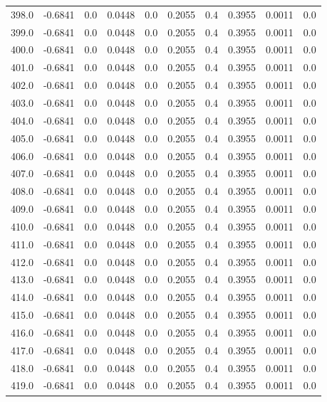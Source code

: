 \begin{longtable}{lrrrrrrrrr}
398.0 & -0.6841 & 0.0 & 0.0448 & 0.0 & 0.2055 & 0.4 & 0.3955 & 0.0011 & 0.0 \\
399.0 & -0.6841 & 0.0 & 0.0448 & 0.0 & 0.2055 & 0.4 & 0.3955 & 0.0011 & 0.0 \\
400.0 & -0.6841 & 0.0 & 0.0448 & 0.0 & 0.2055 & 0.4 & 0.3955 & 0.0011 & 0.0 \\
401.0 & -0.6841 & 0.0 & 0.0448 & 0.0 & 0.2055 & 0.4 & 0.3955 & 0.0011 & 0.0 \\
402.0 & -0.6841 & 0.0 & 0.0448 & 0.0 & 0.2055 & 0.4 & 0.3955 & 0.0011 & 0.0 \\
403.0 & -0.6841 & 0.0 & 0.0448 & 0.0 & 0.2055 & 0.4 & 0.3955 & 0.0011 & 0.0 \\
404.0 & -0.6841 & 0.0 & 0.0448 & 0.0 & 0.2055 & 0.4 & 0.3955 & 0.0011 & 0.0 \\
405.0 & -0.6841 & 0.0 & 0.0448 & 0.0 & 0.2055 & 0.4 & 0.3955 & 0.0011 & 0.0 \\
406.0 & -0.6841 & 0.0 & 0.0448 & 0.0 & 0.2055 & 0.4 & 0.3955 & 0.0011 & 0.0 \\
407.0 & -0.6841 & 0.0 & 0.0448 & 0.0 & 0.2055 & 0.4 & 0.3955 & 0.0011 & 0.0 \\
408.0 & -0.6841 & 0.0 & 0.0448 & 0.0 & 0.2055 & 0.4 & 0.3955 & 0.0011 & 0.0 \\
409.0 & -0.6841 & 0.0 & 0.0448 & 0.0 & 0.2055 & 0.4 & 0.3955 & 0.0011 & 0.0 \\
410.0 & -0.6841 & 0.0 & 0.0448 & 0.0 & 0.2055 & 0.4 & 0.3955 & 0.0011 & 0.0 \\
411.0 & -0.6841 & 0.0 & 0.0448 & 0.0 & 0.2055 & 0.4 & 0.3955 & 0.0011 & 0.0 \\
412.0 & -0.6841 & 0.0 & 0.0448 & 0.0 & 0.2055 & 0.4 & 0.3955 & 0.0011 & 0.0 \\
413.0 & -0.6841 & 0.0 & 0.0448 & 0.0 & 0.2055 & 0.4 & 0.3955 & 0.0011 & 0.0 \\
414.0 & -0.6841 & 0.0 & 0.0448 & 0.0 & 0.2055 & 0.4 & 0.3955 & 0.0011 & 0.0 \\
415.0 & -0.6841 & 0.0 & 0.0448 & 0.0 & 0.2055 & 0.4 & 0.3955 & 0.0011 & 0.0 \\
416.0 & -0.6841 & 0.0 & 0.0448 & 0.0 & 0.2055 & 0.4 & 0.3955 & 0.0011 & 0.0 \\
417.0 & -0.6841 & 0.0 & 0.0448 & 0.0 & 0.2055 & 0.4 & 0.3955 & 0.0011 & 0.0 \\
418.0 & -0.6841 & 0.0 & 0.0448 & 0.0 & 0.2055 & 0.4 & 0.3955 & 0.0011 & 0.0 \\
419.0 & -0.6841 & 0.0 & 0.0448 & 0.0 & 0.2055 & 0.4 & 0.3955 & 0.0011 & 0.0 \\

\end{longtable}
